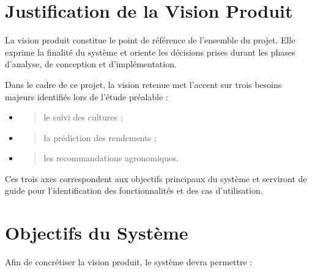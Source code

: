 \hypertarget{justification-de-la-vision-produit}{%
\section{Justification de la Vision
Produit}\label{justification-de-la-vision-produit}}

La vision produit constitue le point de référence de l'ensemble du
projet. Elle exprime la finalité du système et oriente les décisions
prises durant les phases d'analyse, de conception et d'implémentation.

Dans le cadre de ce projet, la vision retenue met l'accent sur trois
besoins majeurs identifiés lors de l'étude préalable :

\begin{itemize}
\item
  \begin{quote}
  le suivi des cultures ;
  \end{quote}
\item
  \begin{quote}
  la prédiction des rendements ;
  \end{quote}
\item
  \begin{quote}
  les recommandations agronomiques.
  \end{quote}
\end{itemize}

Ces trois axes correspondent aux objectifs principaux du système et
serviront de guide pour l'identification des fonctionnalités et des cas
d'utilisation.

\hypertarget{objectifs-du-systuxe8me}{%
\section{Objectifs du Système}\label{objectifs-du-systuxe8me}}

Afin de concrétiser la vision produit, le système devra permettre :

